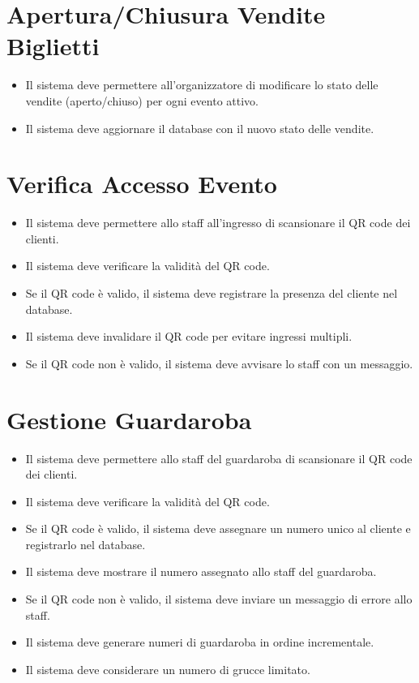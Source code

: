 \documentclass[a4paper,12pt]{article}
\begin{document}
\section*{\textcolor{sectioncolor}{Apertura/Chiusura Vendite Biglietti}}
\textcolor{textcolor}{
\begin{itemize}
    \item Il sistema deve permettere all’organizzatore di modificare lo stato delle vendite (aperto/chiuso) per ogni evento attivo.
    \item Il sistema deve aggiornare il database con il nuovo stato delle vendite.
    \end{itemize}


\section*{\textcolor{sectioncolor}{Verifica Accesso Evento}}
\textcolor{textcolor}{
\begin{itemize}
    \item Il sistema deve permettere allo staff all’ingresso di scansionare il QR code dei clienti.
    \item Il sistema deve verificare la validità del QR code.
    \item Se il QR code è valido, il sistema deve registrare la presenza del cliente nel database.
    \item Il sistema deve invalidare il QR code per evitare ingressi multipli.
    \item Se il QR code non è valido, il sistema deve avvisare lo staff con un messaggio.
\end{itemize}
}

\section*{\textcolor{sectioncolor}{Gestione Guardaroba}}
\textcolor{textcolor}{
\begin{itemize}
    \item Il sistema deve permettere allo staff del guardaroba di scansionare il QR code dei clienti.
    \item Il sistema deve verificare la validità del QR code.
    \item Se il QR code è valido, il sistema deve assegnare un numero unico al cliente e registrarlo nel database.
    \item Il sistema deve mostrare il numero assegnato allo staff del guardaroba.
    \item Se il QR code non è valido, il sistema deve inviare un messaggio di errore allo staff.
    \item Il sistema deve generare numeri di guardaroba in ordine incrementale.
    \item Il sistema deve considerare un numero di grucce limitato.
\end{itemize}
}

}
\end{document}
